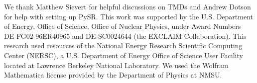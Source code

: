 \documentclass[aps,prd,twocolumn,amsmath,amssymb,floatfix]{revtex4-2}
\begin{document}
\begin{acknowledgments}
We thank Matthew Sievert for helpful discussions on TMDs and Andrew Dotson for help with setting up PySR. This work was supported by the U.S. Department of Energy, Office of Science, Office of Nuclear Physics, under Award Numbers DE-FG02-96ER40965 and DE-SC0024644 (the EXCLAIM Collaboration). This research used resources of the National Energy Research Scientific Computing Center (NERSC), a U.S. Department of Energy Office of Science User Facility located at Lawrence Berkeley National Laboratory. We used the Wolfram Mathematica license provided by the Department of Physics at NMSU.
\end{acknowledgments}

\FloatBarrier
\appendix







\FloatBarrier

\end{document}
